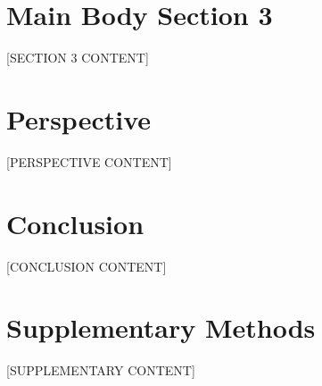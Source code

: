 \documentclass[12pt,a4paper]{article}
\begin{document}
\section{Main Body Section 3}
[SECTION 3 CONTENT]

\section{Perspective}
[PERSPECTIVE CONTENT]

\section{Conclusion}
[CONCLUSION CONTENT]



\appendix
\section{Supplementary Methods}
[SUPPLEMENTARY CONTENT]
\end{document}

